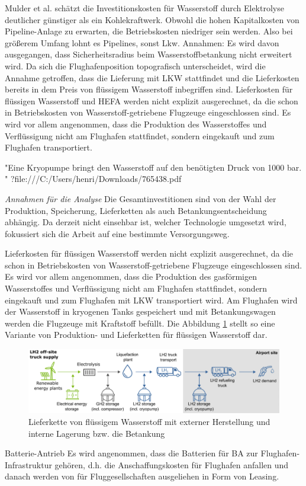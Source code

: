 Mulder et al. \cite{mulder2019outlook} schätzt die Investitionskosten für Wasserstoff durch Elektrolyse deutlicher günstiger als ein Kohlekraftwerk. 
Obwohl die hohen Kapitalkosten von Pipeline-Anlage zu erwarten, die Betriebskosten niedriger sein werden. Also bei größerem Umfang lohnt es Pipelines, sonst Lkw.
Annahmen:
Es wird davon ausgegangen, dass Sicherheitsradius beim Wasserstoffbetankung nicht erweitert wird.
Da sich die Flughafenposition topografisch unterscheidet, wird die Annahme getroffen, dass die Lieferung mit LKW stattfindet 
und die Lieferkosten bereits in dem Preis von flüssigem Wasserstoff inbegriffen sind.
Lieferkosten für flüssigen Wasserstoff  und HEFA werden nicht explizit ausgerechnet,
da die schon in Betriebskosten von Wasserstoff-getriebene Flugzeuge eingeschlossen sind. Es wird vor allem angenommen, dass die Produktion 
des Wasserstoffes und Verflüssigung nicht am Flughafen stattfindet, sondern eingekauft und zum Flughafen transportiert.


"Eine Kryopumpe 
bringt den Wasserstoff auf den benötigten Druck von 1000 bar. " ?file:///C:/Users/henri/Downloads/765438.pdf

\textit{Annahmen für die Analyse}
Die Gesamtinvestitionen sind von der Wahl der Produktion, Speicherung, Lieferketten als auch Betankungsentscheidung abhängig.
Da derzeit nicht einsehbar ist, welcher Technologie umgesetzt wird, fokussiert sich die Arbeit auf eine bestimmte Versorgungsweg.

Lieferkosten für flüssigen Wasserstoff  werden nicht explizit ausgerechnet,
da die schon in Betriebskosten von Wasserstoff-getriebene Flugzeuge eingeschlossen sind. Es wird vor allem angenommen, dass die Produktion 
des gasförmigen Wasserstoffes und Verflüssigung nicht am Flughafen stattfindet, sondern eingekauft und zum Flughafen mit LKW transportiert wird.
Am Flughafen wird der Wasserstoff in kryogenen Tanks gespeichert und mit Betankungswagen werden die Flugzeuge mit Kraftstoff befüllt.
Die Abbildung \ref{supply_wasserstoff} stellt so eine Variante von Produktion- und Lieferketten für flüssigen Wasserstoff dar.

\begin{figure}[h]
	\centering
	\includegraphics[width=0.9\linewidth]{Bilder/Supply_hydrogen.png}
	\caption[Lieferkette von flüssigem Wasserstoff mit externer Herstellung und interner Lagerung bzw. die Betankung]{Lieferkette von flüssigem Wasserstoff mit externer Herstellung und interne Lagerung bzw. die Betankung \cite{schenke2024lh2}}
	\label{supply_wasserstoff}
\end{figure}

Batterie-Antrieb
Es wird angenommen, dass die Batterien für BA zur Flughafen-Infrastruktur gehören, 
d.h. die Anschaffungskosten für Flughafen anfallen und danach werden von für Fluggesellschaften ausgeliehen in Form von Leasing.
